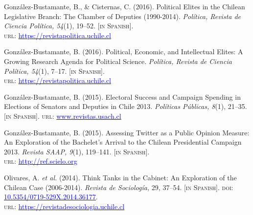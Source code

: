 \begin{publications}
\begin{benumerate}{14}
\item{\small González-Bustamante, B., \& Cisternas, C. (2016). Political Elites in the Chilean Legislative Branch: The Chamber of Deputies (1990-2014). {\itshape Pol\'itica, Revista de Ciencia Pol\'itica, 54}(1), 19--52. {\footnotesize \scshape [in Spanish]}. \\ {\scshape url}: \href{https://revistapolitica.uchile.cl/index.php/RP/article/view/42691}{\textcolor{blue}{https://revistapolitica.uchile.cl}}}\vspace{1mm}

\item{\small González-Bustamante, B. (2016). Political, Economic, and Intellectual Elites: A Growing Research Agenda for Political Science. {\itshape Pol\'itica, Revista de Ciencia Pol\'itica, 54}(1), 7--17. {\footnotesize \scshape [in Spanish]}. \\ {\scshape url}: \href{https://revistapolitica.uchile.cl/index.php/RP/article/view/42690}{\textcolor{blue}{https://revistapolitica.uchile.cl}}}\vspace{1mm}

\item{\small González-Bustamante, B. (2015). Electoral Success and Campaign Spending in Elections of Senators and Deputies in Chile 2013. {\itshape Pol\'iticas P\'ublicas, 8}(1), 21--35. {\footnotesize \scshape [in Spanish]}. {\scshape url}: \href{http://www.revistas.usach.cl/ojs/index.php/politicas/article/view/2182}{\textcolor{blue}{www.revistas.usach.cl}}} \vspace{1mm}

\item{\small González-Bustamante, B. (2015). Assessing Twitter as a Public Opinion Measure: An Exploration of the Bachelet's Arrival to the Chilean Presidential Campaign 2013. {\itshape Revista SAAP, 9}(1), 119--141. {\footnotesize \scshape [in Spanish]}. \\ {\scshape url}: \href{http://ref.scielo.org/dwzhns}{\textcolor{blue}{http://ref.scielo.org}}} \vspace{1mm}

\item{\small Olivares, A. {\itshape et al.} (2014). Think Tanks in the Cabinet: An Exploration of the Chilean Case (2006-2014). {\itshape Revista de Sociolog\'ia,} 29, 37--54. {\footnotesize \scshape [in Spanish]}. {\scshape doi}: \href{https://doi.org/10.5354/0719-529X.2014.36177}{\textcolor{blue}{10.5354/0719-529X.2014.36177}}. \\ {\scshape url}: \href{https://revistadesociologia.uchile.cl/index.php/RDS/article/view/36177}{\textcolor{blue}{https://revistadesociologia.uchile.cl}}} \vspace{1mm}


\end{benumerate}
\end{publications}
